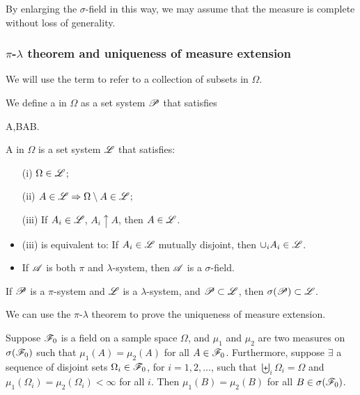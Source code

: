 \documentclass[10pt,a4paper]{article}
\begin{document}
By enlarging the $\sigma$-field in this way, we may assume that the measure is complete
without loss of generality.

\subsubsection{$\pi$-$\lambda$ theorem and uniqueness of measure extension}\label{sec:pi-lambda-thm}
We will use the term  to refer to a collection of subsets in $\Omega$.
\begin{defbox}
	\begin{definition}\label{def:pi-lambda-sys}
		We define a  in $\Omega$ as a set system $\mathscr{P}$ that satisfies 
		\begin{sequation*}
			A,B\in\scrP \Rightarrow A\cap B\in\scrP. 
		\end{sequation*}  
		A  in $\Omega$ is a set system $\mathscr{L}$ that satisfies:
		\begin{enumerate}
			\item[(i)] $\Omega\in\mathscr{L}$;
			\item[(ii)] $A\in\mathscr{L} \Rightarrow \Omega\setminus A\in\mathscr{L} $;
			\item[(iii)] If $A_i\in\mathscr{L}$, $A_i\uparrow A$, then $A\in\mathscr{L}$.      
		\end{enumerate}  
	\end{definition}
\end{defbox} 
\begin{itemize}
	\item (iii) is equivalent to: If $A_i\in\mathscr{L}$ mutually disjoint, then $\cup_i A_i\in\mathscr{L}$.  
	\item If $\mathscr{A}$ is both $\pi$ and $\lambda$-system, then $\mathscr{A}$ is a $\sigma$-field.     
\end{itemize}

\begin{thmbox}
	\begin{theorem}\label{thm:pi-lambda-thm}\rm
		If $\mathscr{P}$ is a $\pi$-system and $\mathscr{L}$ is a $\lambda$-system, and $\mathscr{P}\subset \mathscr{L}$, then $\sigma(\mathscr{P})\subset \mathscr{L}$.      
	\end{theorem}
\end{thmbox}
We can use the $\pi$-$\lambda$ theorem to prove the uniqueness of measure extension.

\begin{thmbox}
	\begin{theorem}\label{thm:unique-measure-extension}\rm
		Suppose $\mathscr{F}_0$ is a field on a sample space $\Omega$, and $\mu_1$ and $\mu_2$ are two measures on $\sigma(\mathscr{F}_0)$ such that $\mu_1(A)=\mu_2(A)$ for all $A\in\mathscr{F}_0$. Furthermore, suppose $\exists$ a sequence of disjoint sets $\Omega_i\in\mathscr{F}_0$, for $i=1,2,\ldots$, such that $\biguplus_i \Omega_i=\Omega$ and $\mu_1(\Omega_i)=\mu_2(\Omega_i)<\infty $ for all $i$. Then $\mu_1(B)=\mu_2(B)$ for all $B\in\sigma(\mathscr{F}_0)$.            
	\end{theorem}
\end{thmbox}
\end{document}
